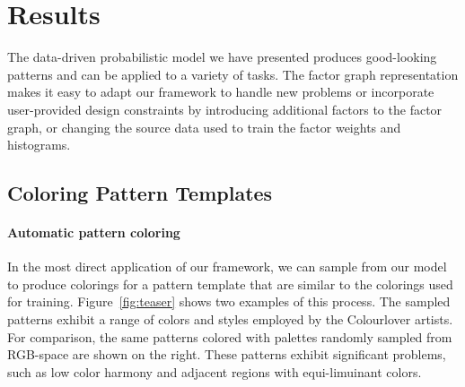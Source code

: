 \section{Results}
\label{sec:results}

The data-driven probabilistic model we have presented produces good-looking patterns and can be applied to a variety of tasks. The factor graph representation makes it easy to adapt our framework to handle new problems or incorporate user-provided design constraints by introducing additional factors to the factor graph, or changing the source data used to train the factor weights and histograms.



\subsection{Coloring Pattern Templates}

\paragraph{Automatic pattern coloring} In the most direct application of our framework, we can sample from our model to produce colorings for a pattern template that are similar to the colorings used for training. Figure~\ref{fig:teaser} shows two examples of this process. The sampled patterns exhibit a range of colors and styles employed by the Colourlover artists. For comparison, the same patterns colored with palettes randomly sampled from RGB-space are shown on the right. These patterns exhibit significant problems, such as low color harmony and adjacent regions with equi-limuinant colors.

